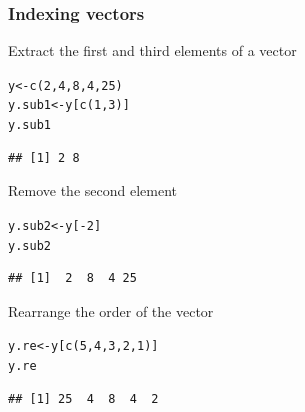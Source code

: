 \documentclass[color=usenames,dvipsnames]{beamer}\usepackage[]{graphicx}\usepackage[]{color}
\makeatletter
\newcommand{\hlnum}[1]{\textcolor[rgb]{0.69,0.494,0}{#1}}%
\newcommand{\hlopt}[1]{\textcolor[rgb]{0,0,0}{#1}}%
\newcommand{\hlstd}[1]{\textcolor[rgb]{0,0,0}{#1}}%
\newcommand{\hlkwb}[1]{\textcolor[rgb]{0,0.341,0.682}{#1}}%
\newcommand{\hlkwd}[1]{\textcolor[rgb]{0.004,0.004,0.506}{#1}}%
\newenvironment{kframe}{%
 \def\at@end@of@kframe{}%
 \ifinner\ifhmode%
  \def\at@end@of@kframe{\end{minipage}}%
  \begin{minipage}{\columnwidth}%
 \fi\fi%
 \def\FrameCommand##1{\hskip\@totalleftmargin \hskip-\fboxsep
 \colorbox{shadecolor}{##1}\hskip-\fboxsep
     \hskip-\linewidth \hskip-\@totalleftmargin \hskip\columnwidth}%
 \MakeFramed {\advance\hsize-\width
   \@totalleftmargin\z@ \linewidth\hsize
   \@setminipage}}%
 {\par\unskip\endMakeFramed%
 \at@end@of@kframe}
\newenvironment{knitrout}{}{} %
\makeatother
\begin{document}




\begin{frame}[fragile]
  \frametitle{Indexing vectors}
  \small
  Extract the first and third elements of a vector
\begin{knitrout}\small
{}\color{fgcolor}\begin{kframe}
\begin{alltt}
\hlstd{y} \hlkwb{<-} \hlkwd{c}\hlstd{(}\hlnum{2}\hlstd{,} \hlnum{4}\hlstd{,} \hlnum{8}\hlstd{,} \hlnum{4}\hlstd{,} \hlnum{25}\hlstd{)}
\hlstd{y.sub1} \hlkwb{<-} \hlstd{y[}\hlkwd{c}\hlstd{(}\hlnum{1}\hlstd{,}\hlnum{3}\hlstd{)]}
\hlstd{y.sub1}
\end{alltt}
\begin{verbatim}
## [1] 2 8
\end{verbatim}
\end{kframe}
\end{knitrout}
\pause \vfill
Remove the second element
\begin{knitrout}\small
{}\color{fgcolor}\begin{kframe}
\begin{alltt}
\hlstd{y.sub2} \hlkwb{<-} \hlstd{y[}\hlopt{-}\hlnum{2}\hlstd{]}
\hlstd{y.sub2}
\end{alltt}
\begin{verbatim}
## [1]  2  8  4 25
\end{verbatim}
\end{kframe}
\end{knitrout}
\pause \vfill
Rearrange the order of the vector
\begin{knitrout}\small
{}\color{fgcolor}\begin{kframe}
\begin{alltt}
\hlstd{y.re} \hlkwb{<-} \hlstd{y[}\hlkwd{c}\hlstd{(}\hlnum{5}\hlstd{,}\hlnum{4}\hlstd{,}\hlnum{3}\hlstd{,}\hlnum{2}\hlstd{,}\hlnum{1}\hlstd{)]}
\hlstd{y.re}
\end{alltt}
\begin{verbatim}
## [1] 25  4  8  4  2
\end{verbatim}
\end{kframe}
\end{knitrout}
\end{frame}
\end{document}
